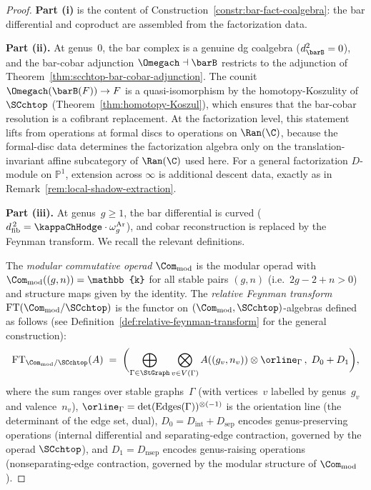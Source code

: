 \begin{proof}
\textbf{Part (i)} is the content of
Construction~\ref{constr:bar-fact-coalgebra}: the bar differential
and coproduct are assembled from the factorization data.

\smallskip\noindent
\textbf{Part (ii).} At genus~$0$, the bar complex is a genuine
dg coalgebra ($d_{\barB}^2 = 0$), and the bar-cobar adjunction
$\Omegach \dashv \barB$ restricts to the adjunction of
Theorem~\ref{thm:scchtop-bar-cobar-adjunction}. The counit
$\Omegach(\barB(F)) \to F$ is a quasi-isomorphism by the
homotopy-Koszulity of $\SCchtop$
(Theorem~\ref{thm:homotopy-Koszul}), which ensures that the
bar-cobar resolution is a cofibrant replacement. At the
factorization level, this statement lifts from operations
at formal discs to operations on $\Ran(\C)$, because the
formal-disc data determines the factorization algebra only on the
translation-invariant affine subcategory of $\Ran(\C)$ used here.
For a general factorization $D$-module on $\mathbb P^1$, extension
across $\infty$ is additional descent data, exactly as in
Remark~\ref{rem:local-shadow-extraction}.

\smallskip\noindent
\textbf{Part (iii).} At genus~$g \geq 1$, the bar differential is
curved ($\dfib^{\,2} = \kappaChHodge \cdot \omega_g^{\mathrm{Ar}}$), and cobar
reconstruction is replaced by the Feynman transform. We recall
the relevant definitions.

The \emph{modular commutative operad} $\Com_{\mathrm{mod}}$ is
the modular operad with
$\Com_{\mathrm{mod}}((g,n)) = \mathbb{k}$ for all stable
pairs $(g,n)$ (i.e.\ $2g - 2 + n > 0$) and structure maps
given by the identity. The \emph{relative Feynman transform}
$\mathrm{FT}(\Com_{\mathrm{mod}} / \SCchtop)$ is the
functor on $(\Com_{\mathrm{mod}}, \SCchtop)$-algebras defined
as follows (see Definition~\ref{def:relative-feynman-transform}
for the general construction):
\[
 \mathrm{FT}_{\Com_{\mathrm{mod}} / \SCchtop}(A)
 \;=\;
 \biggl(
 \bigoplus_{\Gamma \in \StGraph}
 \bigotimes_{v \in V(\Gamma)}
 A((g_v, n_v)) \otimes \orline_\Gamma
 \,,\;
 D_0 + D_1
 \biggr),
\]
where the sum ranges over stable graphs~$\Gamma$ (with
vertices~$v$ labelled by genus~$g_v$ and valence~$n_v$),
$\orline_\Gamma = \det(\mathrm{Edges}(\Gamma))^{\otimes(-1)}$
is the orientation line (the determinant of the edge set, dual),
$D_0 = D_{\mathrm{int}} + D_{\mathrm{sep}}$ encodes
genus-preserving operations (internal differential and
separating-edge contraction, governed by the operad
$\SCchtop$), and
$D_1 = D_{\mathrm{nsep}}$ encodes genus-raising operations
(nonseparating-edge contraction, governed by the modular
structure of $\Com_{\mathrm{mod}}$).


\end{proof}
